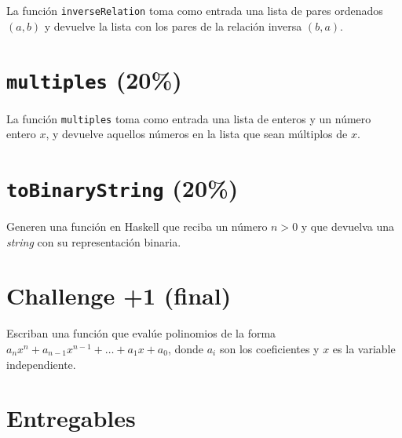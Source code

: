 \documentclass[]{article}
\theoremstyle{definition}
\begin{document}
La función \texttt{inverseRelation} toma como entrada una lista de pares ordenados $(a,b)$ y devuelve la lista con los pares de la relación inversa $(b,a)$.

\section{\texttt{multiples} (20\%)}

La función \texttt{multiples} toma como entrada una lista de enteros y un número entero $x$, y devuelve aquellos números en la lista que sean múltiplos de $x$.

\section{\texttt{toBinaryString} (20\%)}

Generen una función en Haskell que reciba un número $n > 0$ y que devuelva una \textit{string} con su representación binaria.

\section*{Challenge +1 (final)}

Escriban una función que evalúe polinomios de la forma $a_n x^n + a_{n-1} x^{n-1} + \dots + a_1 x + a_0$, donde $a_i$ son los coeficientes y $x$ es la variable independiente.

\section*{Entregables}

\bigskip
\end{document}

